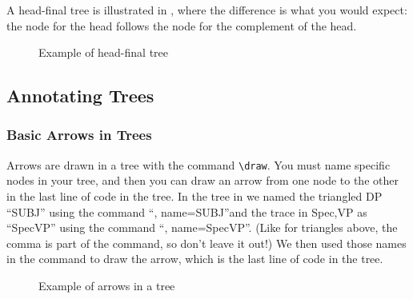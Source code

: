 \documentclass[output=paper,colorlinks,citecolor=brown,
]{langscibook}
\begin{document}
\noindent A head-final tree is illustrated in , where the difference is what you would expect: the node for the head follows the node for the complement of the head. 

\begin{figure}
\caption{Example of head-final tree}
  \label{fig:diercks:HeadFinalTree}
\end{figure}

\subsection{Annotating Trees}

\subsubsection{Basic Arrows in Trees}

Arrows are drawn in a tree with the command \verb|\draw|. You must name specific nodes in your tree, and then you can draw an arrow from one node to the other in the last line of code in the tree. In the tree in  we named the triangled DP ``SUBJ'' using the command ``, name=SUBJ''and the trace in Spec,VP as ``SpecVP'' using the command ``, name=SpecVP''. (Like for triangles above, the comma is part of the command, so don't leave it out!) We then used those names in the command to draw the arrow, which is the last line of code in the tree. 

\begin{figure}
\caption{Example of arrows in a tree}
  \label{fig:diercks:ForestDrawArrows}
\end{figure}
\end{document}
